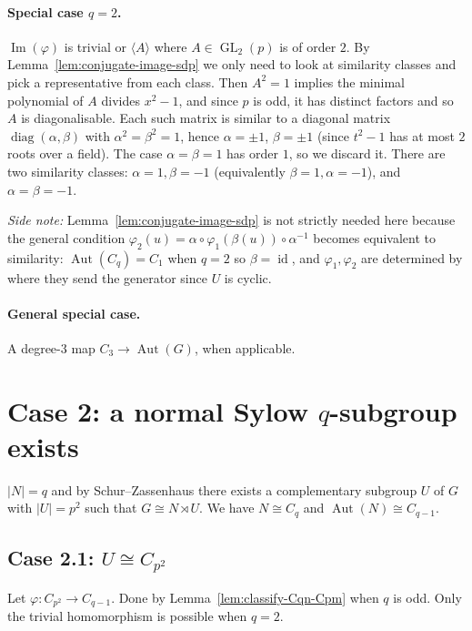 \paragraph{Special case $q = 2$.}
$\operatorname{Im}(\varphi)$ is trivial or $\langle A \rangle$ where $A \in
\operatorname{GL}_2(p)$ is of order $2$. By Lemma~\ref{lem:conjugate-image-sdp}
we only need to look at similarity classes and pick a representative from
each class. Then $A^2 = 1$ implies the minimal polynomial of $A$ divides
$x^2 - 1$, and since $p$ is odd, it has distinct factors and so $A$ is
diagonalisable. Each such matrix is similar to a diagonal matrix
$\operatorname{diag}(\alpha, \beta)$ with $\alpha^2 = \beta^2 = 1$, hence
$\alpha = \pm 1$, $\beta = \pm 1$ (since $t^2 - 1$ has at most $2$ roots over a
field). The case $\alpha = \beta = 1$ has order $1$, so we discard it. There
are two similarity classes: $\alpha = 1, \beta = -1$ (equivalently
$\beta = 1, \alpha = -1$), and $\alpha = \beta = -1$.

\emph{Side note:} Lemma~\ref{lem:conjugate-image-sdp} is not strictly needed
here because the general condition $\varphi_2(u) = \alpha \circ
\varphi_1(\beta(u)) \circ \alpha^{-1}$ becomes equivalent to similarity:
$\operatorname{Aut}(C_q) = C_1$ when $q = 2$ so $\beta = \operatorname{id}$,
and $\varphi_1, \varphi_2$ are determined by where they send the generator
since $U$ is cyclic.

\paragraph{General special case.} A degree-$3$ map $C_3 \to
\operatorname{Aut}(G)$, when applicable.

\section{Case 2: a normal Sylow $q$-subgroup exists}

$|N| = q$ and by Schur--Zassenhaus there exists a complementary subgroup $U$
of $G$ with $|U| = p^2$ such that $G \cong N \rtimes U$. We have $N \cong
C_q$ and $\operatorname{Aut}(N) \cong C_{q-1}$.

\subsection{Case 2.1: $U \cong C_{p^2}$}

Let $\varphi : C_{p^2} \to C_{q-1}$. Done by
Lemma~\ref{lem:classify-Cqn-Cpm} when $q$ is odd. Only the trivial
homomorphism is possible when $q = 2$.

